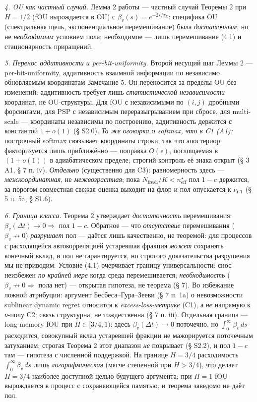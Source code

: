 \documentclass[12pt]{iopart}
\begin{document}
\emph{4. OU как частный случай.} Лемма 2 работы \cite{Andriishin2026b} --- частный случай Теоремы 2 при \(H = 1/2\) (fOU вырождается в OU) с \(\beta_v(s) = e^{-2s/\tau_E}\): специфика OU (спектральная щель, экспоненциальное перемешивание) была \emph{достаточным}, но не \emph{необходимым} условием пола; необходимое --- лишь перемешивание (4.1) и стационарность приращений.



\emph{5. Перенос аддитивности и per-bit-uniformity.} Второй несущий шаг Леммы 2 --- per-bit-uniformity, аддитивность взаимной информации по независимо обновляемым координатам \cite{Andriishin2026b} Замечание 5. Он переносится за пределы OU без изменений: аддитивность требует лишь \emph{статистической независимости} координат, не OU-структуры. Для fOU с независимыми по \((i,j)\) дробными форсингами, для PSP с независимым переразыгрыванием при сбросе, для multi-scale --- координаты независимы по построению, аддитивность держится с константой \(1 + o(1)\) (§ S2.0). \emph{Та же оговорка о softmax, что в C1 (A1):} построчный softmax связывает координаты строки, так что апостериор факторизуется лишь приближённо --- поправка \(O(\epsilon)\), поглощаемая в \((1+o(1))\) в адиабатическом пределе; строгий контроль её знака открыт (§ 3 A1, § 7 п. iv). \emph{Отдельно} (существенно для C3): равномерность здесь --- \emph{межкоординатная}, не \emph{межвозрастная}; пока \(N_{\text{fresh}}/K < n_{\text{eff}}^\star\) пол \(1-c\) держится, за порогом совместная свежая оценка выходит на флор и пол опускается к \(\nu_{C1}\) (§ 5 п. 5a, § S1.6).



\emph{6. Граница класса.} Теорема 2 утверждает \emph{достаточность} перемешивания: \(\beta_v(\Delta t)\to 0 \Rightarrow\) пол \(1-c\). Обратное --- что \emph{отсутствие} перемешивания (\(\beta_v\not\to 0\)) \emph{разрушает} пол --- даётся лишь качественно, не теоремой: для процессов с расходящейся автокорреляцией устаревшая фракция \emph{может} сохранять конечный вклад, и пол не гарантируется, но строгого доказательства разрушения мы не приводим. Условие (4.1) очерчивает границу универсальности: снос неизбежен \emph{по крайней мере} когда среда перемешивается; \emph{необходимость} (\(\beta_v\not\to0 \Rightarrow\) пола нет) --- открытая гипотеза, не теорема (§ 7). Во избежание ложной атрибуции: аргумент Бесбеса--Гура--Зееви (§ 7 п. 1a) о невозможности sublinear dynamic regret относится к \emph{excess-loss-метрике} (C1), а \emph{не} напрямую к \(\nu\)-полу C2; связь структурна, не тождественна (§ 7 п. iii). Отдельная граница --- long-memory fOU при \(H \in [3/4, 1)\): здесь \(\beta_v(\Delta t) \to 0\) поточечно, но \(\int_0^\infty\beta_v\,ds\) расходится, совокупный вклад устаревшей фракции не мажорируется поточечным затуханием; строгая Теорема 2 этот диапазон \emph{не} покрывает (§ S2.2), и пол \(1-c\) там --- гипотеза с численной поддержкой. На границе \(H = 3/4\) расходимость \(\int_0^\infty\beta_v\,ds\) лишь \emph{логарифмическая} (мягче степенной при \(H > 3/4\)), что делает \(H = 3/4\) наиболее доступной целью будущего аргумента; при \(H = 1\) fOU вырождается в процесс с сохраняющейся памятью, и теорема заведомо не даёт пол.
\end{document}
